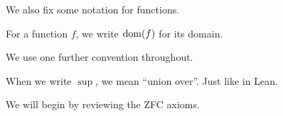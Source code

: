 We also fix some notation for functions.

\begin{boxnotation}
    For a function $f$, we write $\operatorname{dom}\!\left( f \right)$ for its domain.
\end{boxnotation}

We use one further convention throughout.

\begin{boxconvention}
    When we write $\sup$, we mean ``union over''. Just like in Lean.
\end{boxconvention}

We will begin by reviewing the ZFC axioms.






